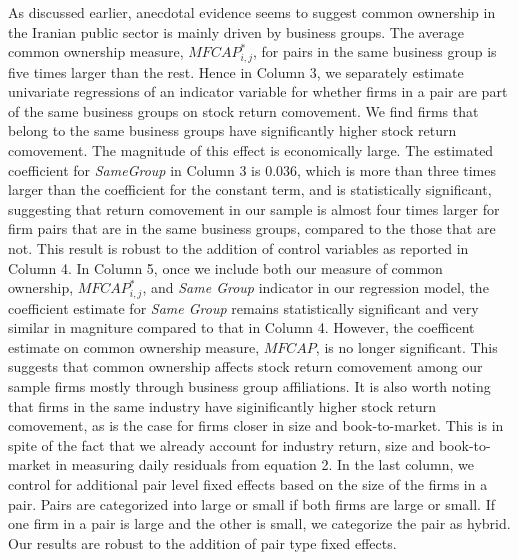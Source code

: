		
		As discussed earlier, anecdotal evidence seems to suggest common ownership in the Iranian public sector is mainly driven by business groups. The average common ownership measure, $ MFCAP^*_{i,j}$, for pairs in the same business group is five times larger than the rest.
		Hence in Column 3, we separately estimate univariate regressions of an indicator variable for whether firms in a pair are part of the same business groups on stock return comovement. We find firms that belong to the same business groups have significantly higher stock return comovement. The magnitude of this effect is economically large.
The estimated coefficient for \textit{SameGroup} in Column 3 is $0.036$, which is more than three times larger than the coefficient for the constant term, and is statistically significant, suggesting that return comovement in our sample is almost four times larger for firm pairs that are in the same business groups, compared to the those that are not. This result is robust to the addition of control variables as reported in Column 4. 
	 In Column 5, once we include both our measure of common ownership, $\textit{MFCAP}^*_{i,j}$, and \textit{Same Group} indicator in our regression model, the coefficient estimate for  \textit{Same Group} remains statistically significant and very similar in magniture compared to that in Column 4. However, the coefficent estimate on common ownership measure, $\textit{MFCAP}$, is no longer significant. This suggests that common ownership affects stock return comovement among our sample firms mostly through business group affiliations. It is also worth noting that firms in the same industry have siginificantly higher stock return comovement, as is the case for firms closer in size and book-to-market. This is in spite of
	 the fact that we already account for industry return, size and book-to-market in measuring daily residuals from equation 2. 
	  In the last column, we control for additional pair level fixed effects based on the size of the firms in a pair. Pairs are categorized into large or small if both firms are large or small. If one firm in a pair is large and the other is small, we categorize the pair as hybrid. Our results are robust to the addition of pair type fixed effects.
	 

